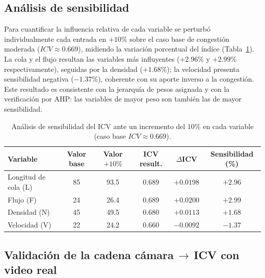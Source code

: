 \subsection{Análisis de sensibilidad}\label{subsec:icv-sensibilidad}

Para cuantificar la influencia relativa de cada variable se perturbó individualmente cada
entrada en $+10\%$ sobre el caso base de congestión moderada ($ICV\approx 0.669$), midiendo la
variación porcentual del índice (Tabla~\ref{tab:sensibilidad}). La cola y el flujo resultan las
variables más influyentes ($+2.96\%$ y $+2.99\%$ respectivamente), seguidas por la densidad
($+1.68\%$); la velocidad presenta sensibilidad negativa ($-1.37\%$), coherente con su aporte
inverso a la congestión. Este resultado es consistente con la jerarquía de pesos asignada y con
la verificación por AHP: las variables de mayor peso son también las de mayor sensibilidad.

\begin{table}[H]
  \centering
  \footnotesize
  \caption{Análisis de sensibilidad del ICV ante un incremento del $10\%$ en cada variable
  (caso base $ICV\approx 0.669$).}
  \label{tab:sensibilidad}
  \begin{tabular}{@{}lccccc@{}}
    \toprule
    \textbf{Variable} & \textbf{Valor base} & \textbf{Valor $+10\%$} &
    \textbf{ICV result.} & \textbf{$\Delta$ICV} & \textbf{Sensibilidad (\%)} \\
    \midrule
    Longitud de cola (L)  & 85 & 93.5 & 0.689 & $+0.0198$ & $+2.96$ \\
    Flujo (F)             & 24 & 26.4 & 0.689 & $+0.0200$ & $+2.99$ \\
    Densidad (N)          & 45 & 49.5 & 0.680 & $+0.0113$ & $+1.68$ \\
    Velocidad (V)         & 22 & 24.2 & 0.660 & $-0.0092$ & $-1.37$ \\
    \bottomrule
  \end{tabular}
\end{table}

\subsection{Validación de la cadena cámara\,$\rightarrow$\,ICV con video real}\label{subsec:icv-video}

